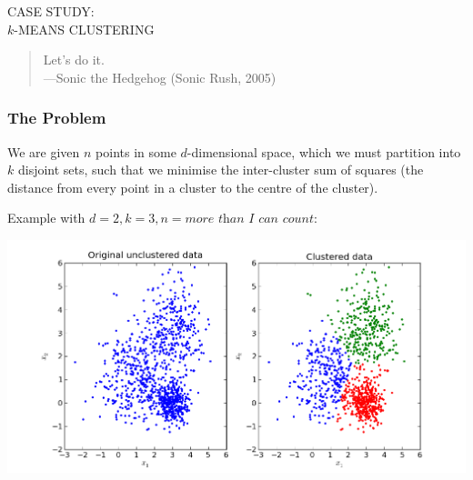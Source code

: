\documentclass[rgb,dvipsnames]{beamer}
\begin{document}
\begin{frame}
  \begin{center}
    \Huge
    CASE STUDY:\\$k$-MEANS CLUSTERING\\
  \end{center}

  \vfill

  \begin{quote}
    Let's do it.\\\hfill---Sonic the Hedgehog (Sonic Rush, 2005)
  \end{quote}
\end{frame}

\begin{frame}
  \frametitle{The Problem}

  We are given $n$ points in some $d$-dimensional space, which we must
  partition into $k$ disjoint sets, such that we minimise the
  inter-cluster sum of squares (the distance from every point in a
  cluster to the centre of the cluster).

  Example with $d=2, k=3, n=\textit{more than I can count}$:

  \begin{center}
    \includegraphics[width=50ex]{img/kmeans.png}
  \end{center}
\end{frame}
\end{document}
